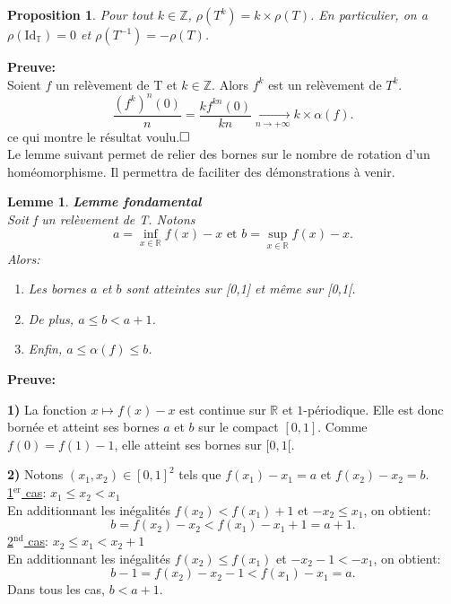 \documentclass[11pt,a4 paper]{article}
\newtheorem{lemme}[theoreme]{Lemme}
\newtheorem{propriete}[theoreme]{Proposition}
\newcommand{\Tbb}{\mathbb{T}}
\newenvironment{ppt}{\begin{box_ppt}\begin{propriete}}{\end{propriete}\end{box_ppt}}
\newenvironment{lm}{\begin{box_lm}\begin{lemme}}{\end{lemme}\end{box_lm}}
\begin{document}
\begin{ppt}\label{k rho}
	Pour tout $k \in \mathbb{Z}$, $\rho(T^k)= k \times \rho(T)$. En particulier, on a $\rho(\mathrm{Id_{\Tbb}})=0$ et $\rho(T^{-1})=-\rho(T)$.
\end{ppt}

\textbf{Preuve:}\\
Soient $f$ un relèvement de T et $k \in \mathbb{Z}$. Alors $f^k$ est un relèvement de $T^k$.
$$\frac{(f^k)^n(0)}{n}=\frac{kf^{kn}(0)}{kn}\underset{n \to + \infty}{\longrightarrow} k \times \alpha(f).$$
ce qui montre le résultat voulu.$\hfill \square$\\ 





Le lemme suivant permet de relier des bornes sur le nombre de rotation d'un homéomorphisme. Il permettra de faciliter des démonstrations à venir.


\begin{lm}\label{bornesnbrot}\textbf{Lemme fondamental}\\
	Soit f un relèvement de T. Notons $$a=\underset{x \in \mathbb{R}}{\inf} f(x) - x \text{ et } b=\underset{x \in \mathbb{R}}{\sup} f(x) - x.$$
Alors:
\begin{enumerate}
	\item Les bornes $a$ et $b$ sont atteintes sur [0,1] et même sur [0,1[.
	\item De plus, $a \leq b < a + 1$.
	\item Enfin, $a \leq \alpha(f) \leq b$.
\end{enumerate}
\end{lm}

	\textbf{Preuve:}
	\par\textbf{1)} La fonction $x\mapsto f(x)-x$ est continue sur $\mathbb{R}$ et $1$-périodique. Elle est donc bornée et atteint ses bornes $a$ et $b$ sur le compact $[0,1]$. Comme $f(0)=f(1)-1$, elle atteint ses bornes sur $[0,1[$. \\

	\par\textbf{2) }Notons $(x_1,x_2) \in [0,1]^2$ tels que $f(x_1)-x_1=a$ et $f(x_2)-x_2=b$.\\
	\underline{1$^{\mathrm{er}}$ cas}: $x_1 \leq x_2 < x_1$\\
	En additionnant les inégalités $f(x_2) < f(x_1)+1$ et $-x_2 \leq x_1$, on obtient:
	$$b=f(x_2) - x_2 < f(x_1) - x_1 + 1 = a+1.$$
	\underline{2$^{\mathrm{nd}}$ cas}: $x_2 \leq x_1 < x_2+1$\\
	En additionnant les inégalités $f(x_2) \leq f(x_1)$ et $-x_2 -1 < -x_1$, on obtient:
	$$b-1 = f(x_2)-x_2 -1 < f(x_1)-x_1 =a.$$
	Dans tous les cas, $b<a+1$.\\
\end{document}

